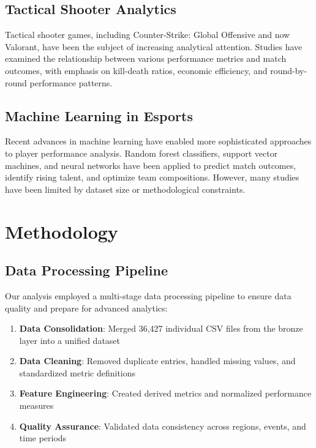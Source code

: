 \documentclass[11pt,a4paper]{article}
\begin{document}
\subsection{Tactical Shooter Analytics}

Tactical shooter games, including Counter-Strike: Global Offensive and now Valorant, have been the subject of increasing analytical attention. Studies have examined the relationship between various performance metrics and match outcomes, with emphasis on kill-death ratios, economic efficiency, and round-by-round performance patterns.

\subsection{Machine Learning in Esports}

Recent advances in machine learning have enabled more sophisticated approaches to player performance analysis. Random forest classifiers, support vector machines, and neural networks have been applied to predict match outcomes, identify rising talent, and optimize team compositions. However, many studies have been limited by dataset size or methodological constraints.

\section{Methodology}

\subsection{Data Processing Pipeline}

Our analysis employed a multi-stage data processing pipeline to ensure data quality and prepare for advanced analytics:

\begin{enumerate}
\item \textbf{Data Consolidation}: Merged 36,427 individual CSV files from the bronze layer into a unified dataset
\item \textbf{Data Cleaning}: Removed duplicate entries, handled missing values, and standardized metric definitions
\item \textbf{Feature Engineering}: Created derived metrics and normalized performance measures
\item \textbf{Quality Assurance}: Validated data consistency across regions, events, and time periods
\end{enumerate}
\end{document}

